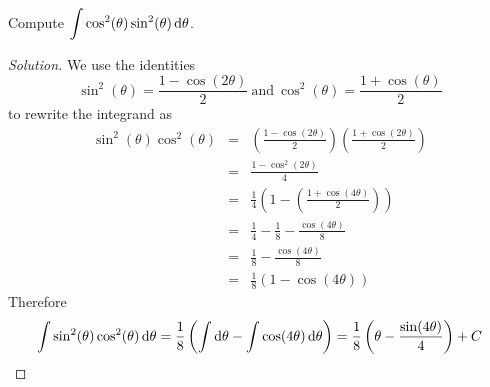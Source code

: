 \documentclass[12pt]{amsart}
\begin{document}
\begin{thm}[20 Points]
  Compute 
    \(\displaystyle{\int \cos^2(\theta)\sin^2(\theta)\dif \theta}\).
\end{thm}
\begin{proof}[Solution]
  We use the identities
  \[\sin^2(\theta) = \frac{1 - \cos(2\theta)}{2}\ \text{and}\ \cos^2(\theta) = \frac{1 + \cos(\theta)}{2}\]
  to rewrite the integrand as
  \begin{eqnarray*}
    \sin^2(\theta)\cos^2(\theta) &=& \left(\frac{1 - \cos(2\theta)}{2}\right)\left(\frac{1 + \cos(2\theta)}{2}\right)\\
    &=& \frac{1 - \cos^2(2\theta)}{4}\\
    &=& \frac{1}{4}\left(1 - \left(\frac{1 + \cos(4\theta)}{2}\right)\right)\\
    &=& \frac{1}{4} - \frac{1}{8} - \frac{\cos(4\theta)}{8}\\
    &=& \frac{1}{8} -\frac{\cos(4\theta)}{8}\\
    &=& \frac{1}{8}\left(1 - \cos(4\theta)\right)
  \end{eqnarray*}
  Therefore
  \[\int \sin^2(\theta)\cos^2(\theta)\dif \theta = \frac{1}{8}\left(\int \dif\theta -\int \cos(4\theta)\dif\theta\right) = \frac{1}{8}\left(\theta - \frac{\sin(4\theta)}{4}\right) + C\]
\end{proof}
\end{document}
